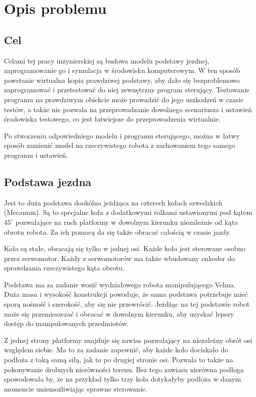 \chapter{Opis problemu}
\section{Cel}
Celami tej pracy inżynierskiej są budowa modelu podstawy jezdnej, zaprogramowanie go i symulacja w środowisku komputerowym.
W ten sposób powstanie wirtualna kopia prawdziwej podstawy, aby dało się bezproblemowo zaprogramować i przetestować do niej zewnętrzny program sterujący.
Testowanie programu na prawdziwym obiekcie może prowadzić do jego uszkodzeń w czasie testów, a także nie pozwala na przeprowadzanie dowolnego scenariusza i ustawień środowiska testowego, 
co jest łatwiejsze do przeprowadzenia wirtualnie.

Po stworzeniu odpowiedniego modelu i programu sterującego, można w łatwy sposób zamienić model na rzeczywistego robota z zachowaniem tego samego programu i ustawień.

\section{Podstawa jezdna}
Jest to duża podstawa dookólna jeżdżąca na czterech kołach szwedzkich (Mecanum).
Są to specjalne koła z dodatkowymi rolkami ustawionymi pod kątem $45^\circ$ pozwalające na ruch platformy w dowolnym kierunku niezależnie od kąta obrotu robota.
Za ich pomocą da się także obracać całością w czasie jazdy.

Koła są stałe, obracają się tylko w jednej osi.
Każde koło jest sterowane osobno przez serwomotor.
Każdy z serwomotorów ma także wbudowany enkoder do sprawdzania rzeczywistego kąta obrotu.

Podstawa ma za zadanie wozić wydziałowego robota manipulującego Velma.
Duża masa i wysokość konstrukcji powoduje, że sama podstawa potrzebuje mieć sporą nośność i szerokość, aby się nie przewrócić.
Jeżdżąc na tej podstawie robot może się przemieszczać i obracać w dowolnym kierunku, aby uzyskać lepszy dostęp do manipulowanych przedmiotów.

Z jednej strony platformy znajduje się zawias pozwalający na niezależny obrót osi względem siebie.
Ma to za zadanie zapewnić, aby każde koło dociskało do podłoża z taką samą siłą, jak to po drugiej stronie osi.
Pozwala to także na pokonywanie drobnych nierówności terenu.
Bez tego zawiasu nierówna podłoga spowodowała by, że na przykład tylko trzy koła dotykałyby podłoża w danym momencie uniemożliwiając sprawne sterowanie.

